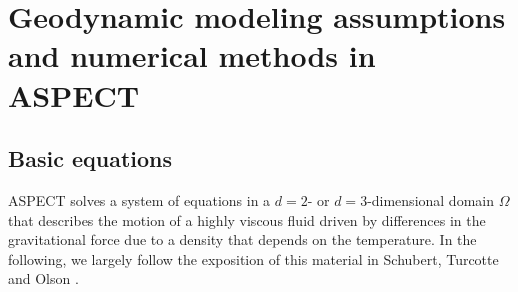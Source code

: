 \documentclass{article}
\newcommand{\aspect}{\textsc{ASPECT}}
\begin{document}
\section{Geodynamic modeling assumptions and numerical methods in \aspect{}}
\label{sec:models}

\subsection{Basic equations}
\label{sec:equations}

\aspect{} solves a system of equations in a $d=2$- or $d=3$-dimensional
domain $\Omega$ that describes the motion of a highly viscous fluid driven
by differences in the gravitational force due to a density that depends on
the temperature. In the following, we largely follow the exposition of this
material in Schubert, Turcotte and Olson \cite{STO01,heister2017high}.
\end{document}
